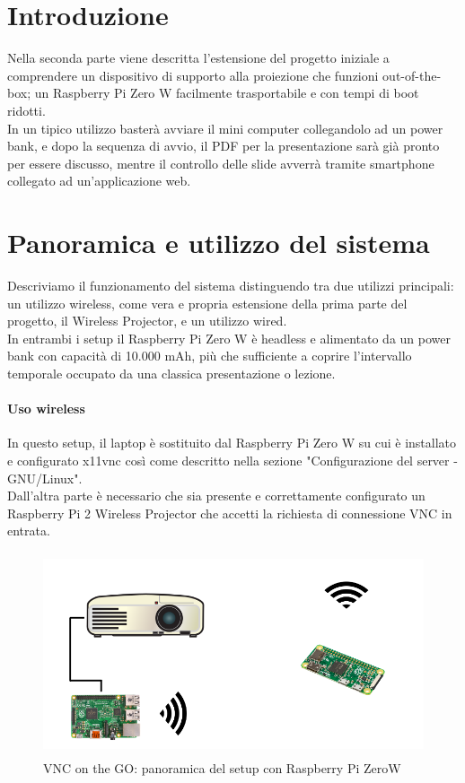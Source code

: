 \section{Introduzione}
Nella seconda parte viene descritta l'estensione del progetto iniziale a comprendere un dispositivo di supporto alla proiezione che funzioni out-of-the-box; un Raspberry Pi Zero W facilmente trasportabile e con tempi di boot ridotti.\\
In un tipico utilizzo basterà avviare il mini computer collegandolo ad un power bank, e dopo la sequenza di avvio, il PDF per la presentazione sarà già pronto per essere discusso, mentre il controllo delle slide avverrà tramite smartphone collegato ad un'applicazione web.\\

\section{Panoramica e utilizzo del sistema}
Descriviamo il funzionamento del sistema distinguendo tra due utilizzi principali: un utilizzo wireless, come vera e propria estensione della prima parte del progetto, il Wireless Projector, e un utilizzo wired.\\
In entrambi i setup il Raspberry Pi Zero W è headless e alimentato da un power bank con capacità di 10.000 mAh,  più che sufficiente a coprire l'intervallo temporale occupato da una classica presentazione o lezione.

\paragraph{Uso wireless}

In questo setup, il laptop è sostituito dal Raspberry Pi Zero W su cui è installato e configurato x11vnc così come descritto nella sezione "Configurazione del server - GNU/Linux".\\
Dall'altra parte è necessario che sia presente e correttamente configurato un Raspberry Pi 2 Wireless Projector che accetti la richiesta di connessione VNC in entrata.

\begin{figure}[h!]
\includegraphics[width=12cm, height=6cm]{../img/setup-with-pizero}
\centering
\caption{VNC on the GO: panoramica del setup con Raspberry Pi ZeroW}
\end{figure}

